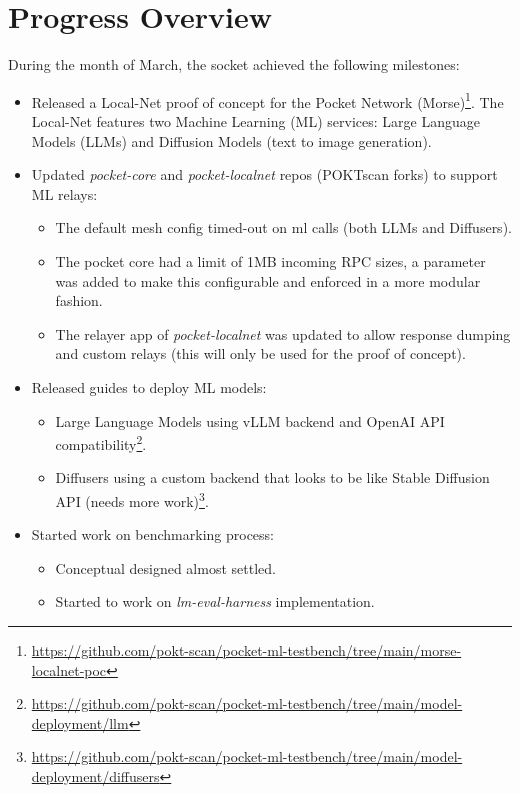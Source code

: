 \section{Progress Overview}\label{sec:ref}

During the month of March, the socket achieved the following milestones:

\begin{itemize}
    \item Released a Local-Net proof of concept for the Pocket Network (Morse)\footnote{\url{https://github.com/pokt-scan/pocket-ml-testbench/tree/main/morse-localnet-poc}}. The Local-Net features two Machine Learning (ML) services: Large Language Models (LLMs) and Diffusion Models (text to image generation).
    \item Updated \emph{pocket-core} and \emph{pocket-localnet} repos (POKTscan forks) to support ML relays:
    \begin{itemize}
        \item The default mesh config timed-out on ml calls (both LLMs and Diffusers).
        \item The pocket core had a limit of 1MB incoming RPC sizes, a parameter was added to make this configurable and enforced in a more modular fashion.
        \item The relayer app of \emph{pocket-localnet} was updated to allow response dumping and custom relays (this will only be used for the proof of concept).
    \end{itemize}
    \item Released guides to deploy ML models:
    \begin{itemize}
        \item Large Language Models using vLLM backend and OpenAI API compatibility\footnote{\url{https://github.com/pokt-scan/pocket-ml-testbench/tree/main/model-deployment/llm}}.
        \item Diffusers using a custom backend that looks to be like Stable Diffusion API (needs more work)\footnote{\url{https://github.com/pokt-scan/pocket-ml-testbench/tree/main/model-deployment/diffusers}}.
    \end{itemize}
    \item Started work on benchmarking process:
    \begin{itemize}
        \item Conceptual designed almost settled.
        \item Started to work on \emph{lm-eval-harness} implementation.
    \end{itemize}
\end{itemize}
